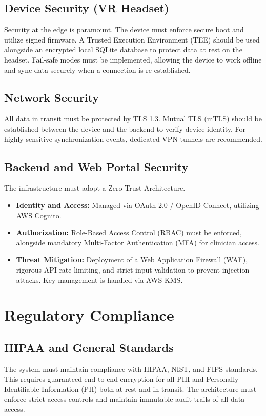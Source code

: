 \documentclass[11pt, letterpaper]{article}
\begin{document}
\subsection{Device Security (VR Headset)}
Security at the edge is paramount. The device must enforce secure boot and utilize signed firmware. A Trusted Execution Environment (TEE) should be used alongside an encrypted local SQLite database to protect data at rest on the headset. Fail-safe modes must be implemented, allowing the device to work offline and sync data securely when a connection is re-established.

\subsection{Network Security}
All data in transit must be protected by TLS 1.3. Mutual TLS (mTLS) should be established between the device and the backend to verify device identity. For highly sensitive synchronization events, dedicated VPN tunnels are recommended.

\subsection{Backend and Web Portal Security}
The infrastructure must adopt a Zero Trust Architecture. 
\begin{itemize}
    \item \textbf{Identity and Access:} Managed via OAuth 2.0 / OpenID Connect, utilizing AWS Cognito.
    \item \textbf{Authorization:} Role-Based Access Control (RBAC) must be enforced, alongside mandatory Multi-Factor Authentication (MFA) for clinician access.
    \item \textbf{Threat Mitigation:} Deployment of a Web Application Firewall (WAF), rigorous API rate limiting, and strict input validation to prevent injection attacks. Key management is handled via AWS KMS.
\end{itemize}

\section{Regulatory Compliance}

\subsection{HIPAA and General Standards}
The system must maintain compliance with HIPAA, NIST, and FIPS standards. This requires guaranteed end-to-end encryption for all PHI and Personally Identifiable Information (PII) both at rest and in transit. The architecture must enforce strict access controls and maintain immutable audit trails of all data access.
\end{document}
